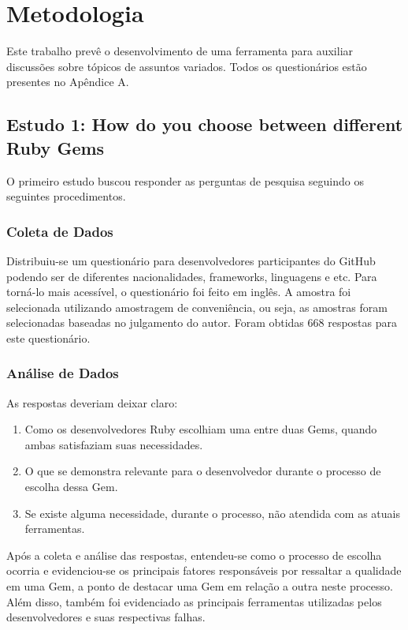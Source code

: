 \chapter{Metodologia}

Este trabalho prevê o desenvolvimento de uma ferramenta para auxiliar discussões sobre tópicos de assuntos variados. Todos os questionários estão presentes no Apêndice A.

\section{Estudo 1: How do you choose between different Ruby Gems}

O primeiro estudo buscou responder as perguntas de pesquisa seguindo os seguintes procedimentos.

\subsection{Coleta de Dados}

Distribuiu-se um questionário para desenvolvedores participantes do GitHub podendo ser de diferentes nacionalidades, frameworks, linguagens e etc. Para torná-lo mais acessível, o questionário foi feito em inglês. A amostra foi selecionada utilizando amostragem de conveniência, ou seja, as amostras foram selecionadas baseadas no julgamento do autor. Foram obtidas 668 respostas para este questionário.

\subsection{Análise de Dados}

As respostas deveriam deixar claro:
\begin{enumerate}
	\item Como os desenvolvedores Ruby escolhiam uma entre duas Gems, quando ambas satisfaziam suas necessidades.
    \item O que se demonstra relevante para o desenvolvedor durante o processo de escolha dessa Gem.
    \item Se existe alguma necessidade, durante o processo, não atendida com as atuais ferramentas.
\end{enumerate}

Após a coleta e análise das respostas, entendeu-se como o processo de escolha ocorria e evidenciou-se os principais fatores responsáveis por ressaltar a qualidade em uma Gem, a ponto de destacar uma Gem em relação a outra neste processo. Além disso, também foi evidenciado as principais ferramentas utilizadas pelos desenvolvedores e suas respectivas falhas. 

